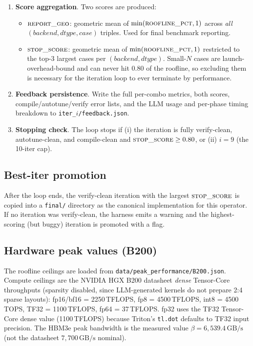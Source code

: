 \documentclass[11pt]{article}
\begin{document}
\begin{enumerate}[leftmargin=*, label=\arabic*.]
    \item \textbf{Score aggregation}. Two scores are produced:
    \begin{itemize}[leftmargin=*]
        \item $\textsc{report\_geo}$: geometric mean of
        $\min(\textsc{roofline\_pct}, 1)$ across \emph{all}
        $(backend, dtype, case)$ triples. Used for final benchmark
        reporting.
        \item $\textsc{stop\_score}$: geometric mean of
        $\min(\textsc{roofline\_pct}, 1)$ restricted to the top-3
        largest cases per $(backend, dtype)$. Small-$N$ cases are
        launch-overhead-bound and can never hit $0.80$ of the roofline,
        so excluding them is necessary for the iteration loop to ever
        terminate by performance.
    \end{itemize}

    \item \textbf{Feedback persistence}. Write the full per-combo
    metrics, both scores, compile/autotune/verify error lists, and the
    LLM usage and per-phase timing breakdown to
    \texttt{iter\_$i$/feedback.json}.

    \item \textbf{Stopping check}. The loop stops if (i) the iteration
    is fully verify-clean, autotune-clean, and compile-clean and
    $\textsc{stop\_score} \geq 0.80$, or (ii) $i = 9$ (the 10-iter cap).
\end{enumerate}

\subsection{Best-iter promotion}

After the loop ends, the verify-clean iteration with the largest
$\textsc{stop\_score}$ is copied into a \texttt{final/} directory as the
canonical implementation for this operator. If no iteration was
verify-clean, the harness emits a warning and the highest-scoring (but
buggy) iteration is promoted with a flag.

\subsection{Hardware peak values (B200)}

The roofline ceilings are loaded from
\texttt{data/peak\_performance/B200.json}. Compute ceilings are the
NVIDIA HGX B200 datasheet \emph{dense} Tensor-Core throughputs (sparsity
disabled, since LLM-generated kernels do not prepare 2:4 sparse layouts):
fp16/bf16 = 2250\,TFLOPS, fp8 = 4500\,TFLOPS, int8 = 4500\,TOPS, TF32 =
1100\,TFLOPS, fp64 = 37\,TFLOPS. fp32 uses the TF32 Tensor-Core dense
value (1100\,TFLOPS) because Triton's \texttt{tl.dot} defaults to TF32
input precision. The HBM3e peak bandwidth is the measured value
$\beta = 6{,}539.4\,\text{GB/s}$ (not the datasheet $7{,}700\,\text{GB/s}$
nominal).
\end{document}
